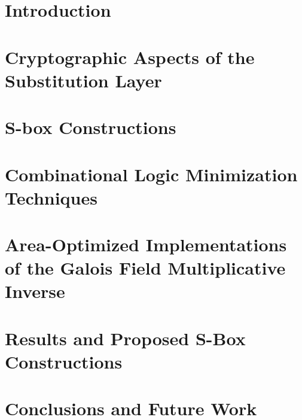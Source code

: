 \documentclass[11pt,american]{report}
\begin{document}
\body 


\chapter{Introduction}



\chapter{Cryptographic Aspects of the Substitution Layer} \label{chp:motivation}
%



\chapter{S-box Constructions} \label{chp:sboxConstruction}


\chapter{Combinational Logic Minimization Techniques} \label{chp:optimizeLogic}

\newpage


\chapter{Area-Optimized Implementations of the Galois Field Multiplicative Inverse} \label{chp:inverseImpl}


\chapter{Results and Proposed S-Box Constructions} \label{chp:results}


\chapter{Conclusions and Future Work} \label{chp:future}


% 
\end{document}
